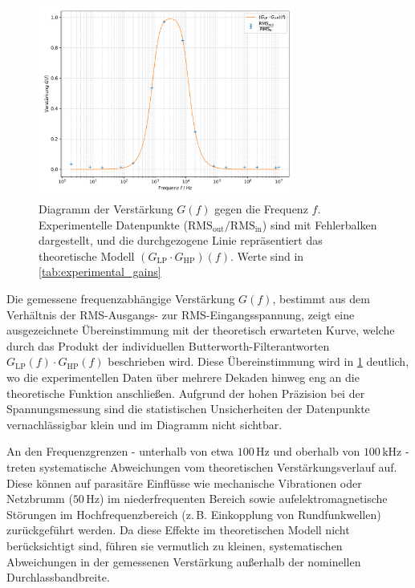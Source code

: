 \begin{figure}[htbp]
    \centering
    \includegraphics[width=0.75\textwidth]{figs/Gvsf.png}
    \caption{Diagramm der Verstärkung $G(f)$ gegen die Frequenz $f$. Experimentelle Datenpunkte ($\mathrm{RMS}_{\mathrm{out}}/\mathrm{RMS}_{\mathrm{in}}$) sind mit Fehlerbalken dargestellt, und die durchgezogene Linie repräsentiert das theoretische Modell $(G_{\mathrm{LP}}\cdot G_{\mathrm{HP}})(f)$. Werte sind in \cref{tab:experimental_gains}}

    \label{fig:gvsf}
\end{figure}

Die gemessene frequenzabhängige Verstärkung $G(f)$, bestimmt aus dem Verhältnis der RMS-Ausgangs- zur RMS-Eingangsspannung, zeigt eine ausgezeichnete Übereinstimmung mit der theoretisch erwarteten Kurve, welche durch das Produkt der individuellen Butterworth-Filterantworten $G_{\mathrm{LP}}(f)\cdot G_{\mathrm{HP}}(f)$ beschrieben wird. 
Diese Übereinstimmung wird in \cref{fig:gvsf} deutlich, wo die experimentellen Daten über mehrere Dekaden hinweg eng an die theoretische Funktion anschließen. 
Aufgrund der hohen Präzision bei der Spannungsmessung sind die statistischen Unsicherheiten der Datenpunkte vernachlässigbar klein und im Diagramm nicht sichtbar.

An den Frequenzgrenzen - unterhalb von etwa $100\,\mathrm{Hz}$ und oberhalb von $100\,\mathrm{kHz}$ - treten systematische Abweichungen vom theoretischen Verstärkungsverlauf auf. 
Diese können auf parasitäre Einflüsse wie mechanische Vibrationen oder Netzbrumm ($50\, \mathrm{Hz}$) im niederfrequenten Bereich sowie aufelektromagnetische Störungen im Hochfrequenzbereich (z.\,B. Einkopplung von Rundfunkwellen) zurückgeführt werden. 
Da diese Effekte im theoretischen Modell nicht berücksichtigt sind, führen sie vermutlich zu kleinen, systematischen Abweichungen in der gemessenen Verstärkung außerhalb der nominellen Durchlassbandbreite.

